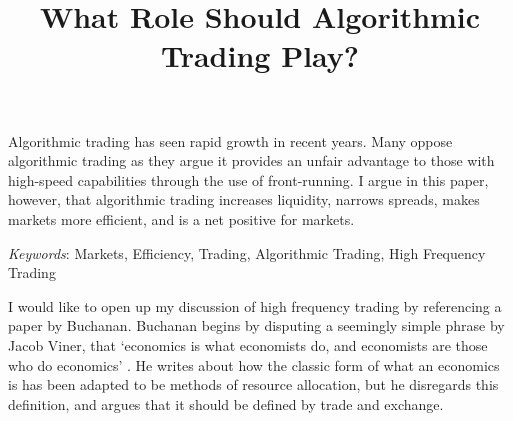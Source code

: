 \documentclass[11pt,]{article}
\title{What Role Should Algorithmic Trading Play?  }
\author{\Large \vspace{0.05in} \newline\normalsize\emph{}  }
\date{}
\newcommand*{\authorfont}{\fontfamily{phv}\selectfont}
\renewenvironment{abstract}
 {{%
    \setlength{\leftmargin}{0mm}
    \setlength{\rightmargin}{\leftmargin}%
  }%
  \relax}
 {\endlist}
\begin{document}
	
%

{%
\setlength{\parindent}{0pt}
\thispagestyle{plain}
{\fontsize{18}{20}\selectfont\raggedright 
\maketitle  %

}

{
   \vskip 13.5pt\relax \normalsize\fontsize{11}{12} 
\textbf{\authorfont } \hskip 15pt \emph{\small }   

}

}







\begin{abstract}

    \hbox{\vrule height .2pt width 39.14pc}

    \vskip 8.5pt %

\noindent Algorithmic trading has seen rapid growth in recent years. Many oppose
algorithmic trading as they argue it provides an unfair advantage to
those with high-speed capabilities through the use of front-running. I
argue in this paper, however, that algorithmic trading increases
liquidity, narrows spreads, makes markets more efficient, and is a net
positive for markets.


\vskip 8.5pt \noindent \emph{Keywords}: Markets, Efficiency, Trading, Algorithmic Trading, High Frequency
Trading \par

    \hbox{\vrule height .2pt width 39.14pc}



\end{abstract}


\vskip 6.5pt

\noindent \doublespacing I would like to open up my discussion of high frequency trading by
referencing a paper by Buchanan. Buchanan begins by disputing a
seemingly simple phrase by Jacob Viner, that `economics is what
economists do, and economists are those who do economics'
\citet{Buchanan1979}. He writes about how the classic form of what an
economics is has been adapted to be methods of resource allocation, but
he disregards this definition, and argues that it should be defined by
trade and exchange.
\end{document}
